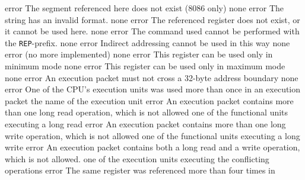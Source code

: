 \documentclass[12pt,twoside]{report}
\newcommand{\tty}[1]{{\tt #1}}
\begin{document}
\begin{description}
               {error}
               {The segment referenced here does not exist (8086 only)}
               {none}
               {error}
               {The string has an invalid format.}
               {none}
               {error}
               {The referenced register does not exist, or it cannot
                be used here.}
               {none}
               {error}
               {The command used cannot be performed with the \tty{REP}-prefix.}
               {none}
               {error}
               {Indirect addressing cannot be used in this way}
               {none}
               {error}
               {(no more implemented)}
               {none}
               {error}
               {This register can be used only in minimum mode}
               {none}
               {error}
               {This register can be used only in maximum mode}
               {none}
               {error}
               {An execution packet must not cross a 32-byte address
                boundary}
               {none}
               {error}
               {One of the CPU's execution units was used more than
                once in an execution packet}
               {the name of the execution unit}
               {error}
               {An execution packet contains more than one long read
                operation, which is not allowed}
               {one of the functional units executing a long read}
               {error}
               {An execution packet contains more than one long write
                operation, which is not allowed}
               {one of the functional units executing a long write}
               {error}
               {An execution packet contains both a long read and a write
                operation, which is not allowed.}
               {one of the execution units executing the conflicting
                operations}
               {error}
               {The same register was referenced more than four times in
}
\end{description}
\end{document}
